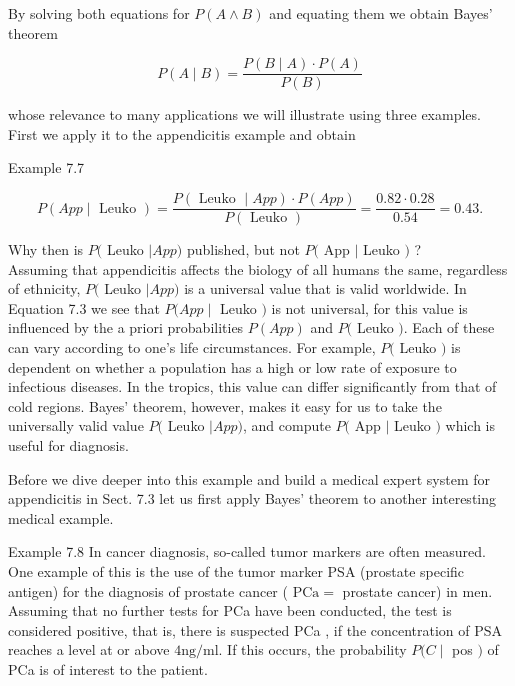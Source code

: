 \documentclass[10pt]{book}
\begin{document}
By solving both equations for $P(A \wedge B)$ and equating them we obtain Bayes’ theorem


\begin{equation*}
P(A \mid B)=\frac{P(B \mid A) \cdot P(A)}{P(B)} \tag{7.2}
\end{equation*}


whose relevance to many applications we will illustrate using three examples. First we apply it to the appendicitis example and obtain

Example 7.7

\begin{equation*}
P(A p p \mid \text { Leuko })=\frac{P(\text { Leuko } \mid A p p) \cdot P(A p p)}{P(\text { Leuko })}=\frac{0.82 \cdot 0.28}{0.54}=0.43 . \tag{7.3}
\end{equation*}


Why then is $P($ Leuko $\mid A p p)$ published, but not $P($ App $\mid$ Leuko $)$ ?\\
Assuming that appendicitis affects the biology of all humans the same, regardless of ethnicity, $P($ Leuko $\mid A p p)$ is a universal value that is valid worldwide. In Equation 7.3 we see that $P(A p p \mid$ Leuko $)$ is not universal, for this value is influenced by the a priori probabilities $P(A p p)$ and $P($ Leuko $)$. Each of these can vary according to one's life circumstances. For example, $P($ Leuko $)$ is dependent on whether a population has a high or low rate of exposure to infectious diseases. In the tropics, this value can differ significantly from that of cold regions. Bayes' theorem, however, makes it easy for us to take the universally valid value $P($ Leuko $\mid A p p)$, and compute $P($ App $\mid$ Leuko $)$ which is useful for diagnosis.

Before we dive deeper into this example and build a medical expert system for appendicitis in Sect. 7.3 let us first apply Bayes' theorem to another interesting medical example.

Example 7.8 In cancer diagnosis, so-called tumor markers are often measured. One example of this is the use of the tumor marker PSA (prostate specific antigen) for the diagnosis of prostate cancer ( $\mathrm{PCa}=$ prostate cancer) in men. Assuming that no further tests for PCa have been conducted, the test is considered positive, that is, there is suspected PCa , if the concentration of PSA reaches a level at or above $4 \mathrm{ng} / \mathrm{ml}$. If this occurs, the probability $P(C \mid$ pos $)$ of PCa is of interest to the patient.
\end{document}
